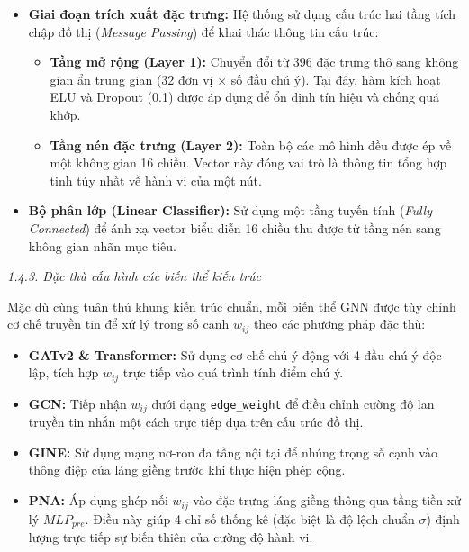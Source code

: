 \begin{itemize}[label={--}, itemsep=3pt]
    \item \textbf{Giai đoạn trích xuất đặc trưng:} Hệ thống sử dụng cấu trúc hai tầng tích chập đồ thị (\textit{Message Passing}) để khai thác thông tin cấu trúc:
    \begin{itemize}[label={+}, itemsep=2pt]
        \item \textbf{Tầng mở rộng (Layer 1):} Chuyển đổi từ 396 đặc trưng thô sang không gian ẩn trung gian (32 đơn vị × số đầu chú ý). Tại đây, hàm kích hoạt ELU và Dropout (0.1) được áp dụng để ổn định tín hiệu và chống quá khớp.
        \item \textbf{Tầng nén đặc trưng (Layer 2):} Toàn bộ các mô hình đều được ép về một không gian 16 chiều. Vector này đóng vai trò là thông tin tổng hợp tinh túy nhất về hành vi của một nút.
    \end{itemize}
    \item \textbf{Bộ phân lớp (Linear Classifier):} Sử dụng một tầng tuyến tính (\textit{Fully Connected}) để ánh xạ vector biểu diễn 16 chiều thu được từ tầng nén sang không gian nhãn mục tiêu.
\end{itemize}

\textit{1.4.3. Đặc thù cấu hình các biến thể kiến trúc}\vspace{0.2cm}

\indent Mặc dù cùng tuân thủ khung kiến trúc chuẩn, mỗi biến thể GNN được tùy chỉnh cơ chế truyền tin để xử lý trọng số cạnh $w_{ij}$ theo các phương pháp đặc thù:
\begin{itemize}[label={--}, itemsep=3pt]
    \item \textbf{GATv2 \& Transformer:} Sử dụng cơ chế chú ý động với 4 đầu chú ý độc lập, tích hợp $w_{ij}$ trực tiếp vào quá trình tính điểm chú ý.
    \item \textbf{GCN:} Tiếp nhận $w_{ij}$ dưới dạng \texttt{edge\_weight} để điều chỉnh cường độ lan truyền tin nhắn một cách trực tiếp dựa trên cấu trúc đồ thị.
    \item \textbf{GINE:} Sử dụng mạng nơ-ron đa tầng nội tại để nhúng trọng số cạnh vào thông điệp của láng giềng trước khi thực hiện phép cộng.
    \item \textbf{PNA:} Áp dụng ghép nối $w_{ij}$ vào đặc trưng láng giềng thông qua tầng tiền xử lý $MLP_{pre}$. Điều này giúp 4 chỉ số thống kê (đặc biệt là độ lệch chuẩn $\sigma$) định lượng trực tiếp sự biến thiên của cường độ hành vi.
\end{itemize}